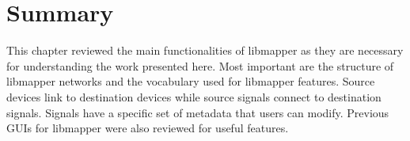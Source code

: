 
\section{Summary} %
\label{sec:libmapper_summary}

This chapter reviewed the main functionalities of libmapper as they are necessary for understanding the work presented here. Most important are the structure of libmapper networks and the vocabulary used for libmapper features. Source devices link to destination devices while source signals connect to destination signals. Signals have a specific set of metadata that users can modify. Previous GUIs for libmapper were also reviewed for useful features.


